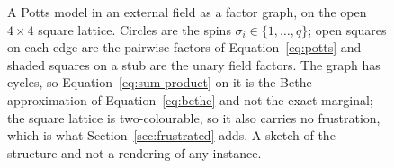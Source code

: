 \begin{figure}[htbp]
\centering
{}
\caption{A Potts model in an external field as a factor graph, on the open
$4 \times 4$ square lattice. Circles are the spins $\sigma_i \in \{1, \dots,
q\}$; open squares on each edge are the pairwise factors of
Equation~\ref{eq:potts} and shaded squares on a stub are the unary field
factors. The graph has cycles, so Equation~\ref{eq:sum-product} on it is the
Bethe approximation of Equation~\ref{eq:bethe} and not the exact marginal;
the square lattice is two-colourable, so it also carries no frustration,
which is what Section~\ref{sec:frustrated} adds. A sketch of the structure
and not a rendering of any instance.}
\label{fig:potts:sketch}
\end{figure}
